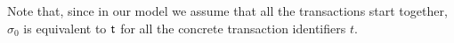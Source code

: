 Note that, since in our model we assume that all the transactions start together, $\sigma_0$ is equivalent to ${\sf t}$ for all the concrete transaction identifiers $t$.


%
%
%
%
%
%
%
%
%
%
%
